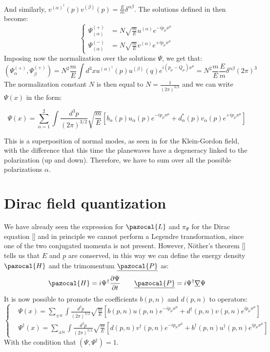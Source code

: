 \documentclass[../main.tex]{subfiles}
\begin{document}
And similarly, $v^{(\alpha)^\dagger}(p)v^{(\beta)}(p)=\frac{E}{m}\delta^{\alpha\beta}$. The solutions defined in  then become:
\[
\left\{
\begin{aligned}
\Psi^{(+)}_{(\alpha)}&=N\sqrt{\frac{m}{E}}u^{(\alpha)}e^{-ip_\mu x^\mu}\\
\Psi^{(-)}_{(\alpha)}&=N\sqrt{\frac{m}{E}}v^{(\alpha)}e^{+ip_\mu x^\mu}
\end{aligned}
\right.
\]
Imposing now the normalization over the solutions $\Psi$, we get that:
\[
(\Psi^{(+)}_\alpha,\Psi^{(+)}_\beta)=N^2\frac{m}{E}\int d^3xu^{(\alpha)^\dagger}(p)u^{(\beta)}(q)e^{i(p_\mu-Q_\mu)x^\mu}=N^2\frac{m}{E}\frac{E}{m}\delta^{\alpha\beta}(2\pi)^3
\]
The normalization constant $N$ is then equal to $N=\frac{1}{(2\pi)^{3/2}}$ and we can write $\Psi(x)$ in the form:
\begin{kaobox}[frametitle=Solution of the Dirac equation]
\[
\Psi(x)=\sum_{\alpha=1}^2\int \frac{d^3p}{(2\pi)^{3/2}}\sqrt{\frac{m}{E}}\left[b_\alpha(p)u_\alpha(p)e^{-ip_\mu x^\mu}+d^*_\alpha(p)v_\alpha(p)e^{+ip_\mu x^\mu}\right]
\]
\end{kaobox}
This is a superposition of normal modes, as seen in  for the Klein-Gordon field, with the difference that this time the planewaves have a degeneracy linked to the polarization (up and down). Therefore, we have to sum over all the possible polarizations $\alpha$.
\section{Dirac field quantization}
We have already seen the expression for $\pazocal{L}$ and $\pi_\Psi$ for the Dirac equation [] and in principle we cannot perform a Legendre transformation, since one of the two conjugated momenta is not present. However, N\"other's theorem [] tells us that $E$ and $\underline{p}$ are conserved, in this way we can define the energy density $\pazocal{H}$ and the trimomentum $\underline{\pazocal{P}}$ as:
\[
\pazocal{H}=i\Psi^\dagger\frac{\partial\Psi}{\partial t} \quad \quad \underline{\pazocal{P}}=i\Psi^\dagger\underline{\nabla}\Psi
\]
It is now possible to promote the coefficients $b(p,n)$ and $d(p,n)$ to operators:
\[
\left\{
\begin{aligned}
&\Psi(x)=\sum_{\pm n}\int\frac{d^3p}{(2\pi)^{3/2}}\sqrt{\frac{m}{E}}\left[b(p,n)u(p,n)e^{-ip_\mu x^\mu}+d^\dagger(p,n)v(p,n)e^{ip_\mu x^\mu}\right]\\
&\Psi^\dagger(x)=\sum_{\pm n}\int\frac{d^3p}{(2\pi)^{3/2}}\sqrt{\frac{m}{E}}\left[d(p,n)v^\dagger(p,n)e^{-ip_\mu x^\mu}+b^\dagger(p,n)u^\dagger(p,n)e^{ip_\mu x^\mu}\right]
\end{aligned}
\right.
\]
With the condition that $(\Psi,\Psi^\dagger)=1$.
\end{document}
